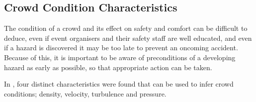 




\subsection{Crowd Condition Characteristics}

The condition of a crowd and its effect on safety and comfort can be difficult to deduce, even if event organisers and their safety staff are well educated\cite{franke2015smart}, and even if a hazard is discovered it may be too late to prevent an oncoming accident. Because of this, it is important to be aware of preconditions of a developing hazard as early as possible, so that appropriate action can be taken.

In \citet{wirz2012inferring}, four distinct characteristics were found that can be used to infer crowd conditions; density, velocity, turbulence and pressure.


